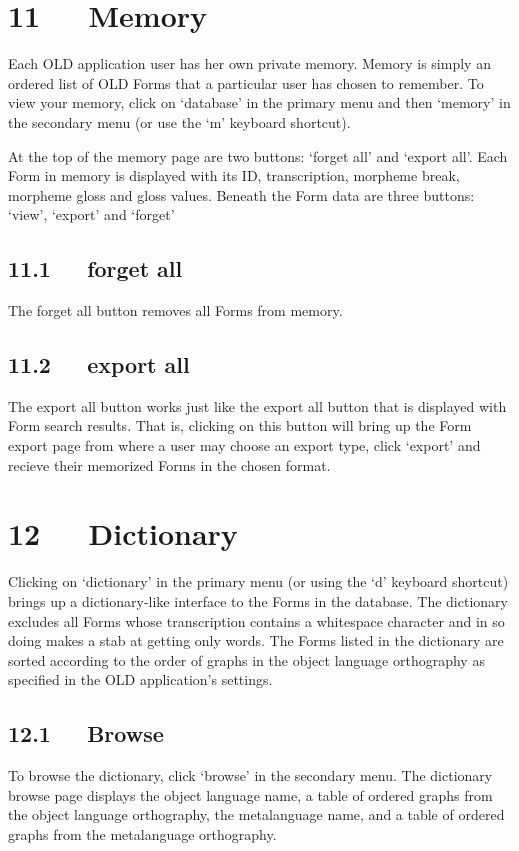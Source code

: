 \documentclass[letterpaper,10pt,english]{sphinxmanual}
\begin{document}
\chapter{11   Memory}
\label{documentation:memory}
Each OLD application user has her own private memory.  Memory is simply an
ordered list of OLD Forms that a particular user has chosen to remember.  To
view your memory, click on `database' in the primary menu and then `memory' in
the secondary menu (or use the `m' keyboard shortcut).

At the top of the memory page are two buttons: `forget all' and `export all'.
Each Form in memory is displayed with its ID, transcription, morpheme break,
morpheme gloss and gloss values.  Beneath the Form data are three buttons:
`view', `export' and `forget'


\section{11.1   forget all}
\label{documentation:forget-all}
The forget all button removes all Forms from memory.


\section{11.2   export all}
\label{documentation:id22}
The export all button works just like the export all button that is displayed
with Form search results.  That is, clicking on this button will bring up the
Form export page from where a user may choose an export type, click `export' and
recieve their memorized Forms in the chosen format.


\chapter{12   Dictionary}
\label{documentation:dictionary}
Clicking on `dictionary' in the primary menu (or using the `d' keyboard
shortcut) brings up a dictionary-like interface to the Forms in the database.
The dictionary excludes all Forms whose transcription contains a whitespace
character and in so doing makes a stab at getting only words.  The Forms listed
in the dictionary are sorted according to the order of graphs in the object
language orthography as specified in the OLD application's settings.


\section{12.1   Browse}
\label{documentation:browse}
To browse the dictionary, click `browse' in the secondary menu.  The dictionary
browse page displays the object language name, a table of ordered graphs from
the object language orthography, the metalanguage name, and a table of ordered
graphs from the metalanguage orthography.
\end{document}
